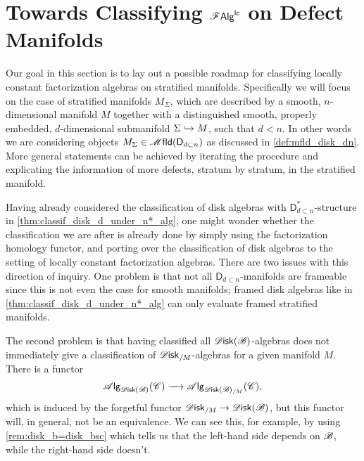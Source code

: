 \documentclass[../text]{subfiles}
\begin{document}
\section{Towards Classifying \texorpdfstring{$\mathscr{F} \mathsf{Alg}^{\mathsf{lc}}$}{FAlglc} on Defect Manifolds}\label{ch:classif_defect_mfld}

Our goal in this section is to lay out a possible roadmap for classifying locally constant factorization algebras on stratified manifolds. Specifically we will focus on the case of stratified manifolds $M_{\Sigma}$, which are described by a smooth, $n$-dimensional manifold $M$ together with a distinguished smooth, properly embedded, $d$-dimensional submanifold $\Sigma \xhookrightarrow{} M$, such that $d < n$. In other words we are considering objects $M_{\Sigma} \in \mfld(\mathsf{D}_{d \subset n})$ as discussed in \cref{def:mfld_disk_dn}. More general statements can be achieved by iterating the procedure and explicating the information of more defects, stratum by stratum, in the stratified manifold.

\begin{remark}\label{rem:disk_not_enough}
    Having already considered the classification of disk algebras with $\mathsf{D}_{d \subset n}^*$-structure in \cref{thm:classif_disk_d_under_n*_alg}, one might wonder whether the classification we are after is already done by simply using the factorization homology functor, and porting over the classification of disk algebras to the setting of locally constant factorization algebras. There are two issues with this direction of inquiry. One problem is that not all $\mathsf{D}_{d \subset n}$-manifolds are frameable since this is not even the case for smooth manifolds; framed disk algebras like in \cref{thm:classif_disk_d_under_n*_alg} can only evaluate framed stratified manifolds.
    
    The second problem is that having classified all $\disk(\bstr)$-algebras does not immediately give a classification of $\disk_{/M}$-algebras for a given manifold $M$. There is a functor
    \begin{equation}
        \alg{\disk(\bstr)}(\catC) \xrightarrow{\quad} \alg{\disk(\bstr)_{/M}} (\catC),
    \end{equation}
    which is induced by the forgetful functor $\disk_{/M} \rightarrow \disk(\bstr)$, but this functor will, in general, not be an equivalence. We can see this, for example, by using \cref{rem:disk_b=disk_bsc} which tells us that the left-hand side depends on $\mathscr{B}$, while the right-hand side doesn't. 
\end{remark}
\end{document}
